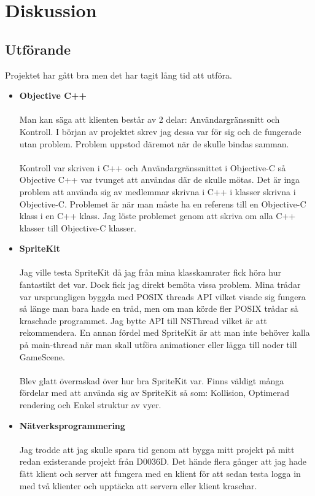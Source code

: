 \documentclass[10pt, titlepage, oneside, a4paper]{article}
\begin{document}
    \section{Diskussion}
		\subsection{Utförande}
		
		Projektet har gått bra men det har tagit lång tid att utföra.
		\begin{itemize}
			\item\textbf{Objective C++}\\\\Man kan säga att klienten består av 2 delar: Användargränssnitt och Kontroll. I början av projektet skrev jag dessa var för sig och de fungerade utan problem. Problem uppstod däremot när de skulle bindas samman.\\\\Kontroll var skriven i C++ och Användargränssnittet i Objective-C så Objective C++ var tvunget att användas där de skulle mötas. Det är inga problem att använda sig av medlemmar skrivna i C++ i klasser skrivna i Objective-C. Problemet är när man måste ha en referens till en Objective-C klass i en C++ klass. Jag löste problemet genom att skriva om alla C++ klasser till Objective-C klasser.
			
			\item\textbf{SpriteKit}\\\\Jag ville testa SpriteKit då jag från mina klasskamrater fick höra hur fantastikt det var. Dock fick jag direkt bemöta vissa problem. Mina trådar var ursprungligen byggda med POSIX threads API vilket visade sig fungera så länge man bara hade en tråd, men om man körde fler POSIX trådar så kraschade programmet. Jag bytte API till NSThread vilket är att rekommendera. En annan fördel med SpriteKit är att man inte behöver kalla på main-thread när man skall utföra animationer eller lägga till noder till GameScene.\\\\Blev glatt överraskad över hur bra SpriteKit var. Finns väldigt många fördelar med att använda sig av SpriteKit så som: Kollision, Optimerad rendering och Enkel struktur av vyer.
			
			\item\textbf{Nätverksprogrammering}\\\\Jag trodde att jag skulle spara tid genom att bygga mitt projekt på mitt redan existerande projekt från D0036D. Det hände flera gånger att jag hade fått klient och server att fungera med en klient för att sedan testa logga in med två klienter och upptäcka att servern eller klient kraschar. 
		\end{itemize}
    	
\end{document}
